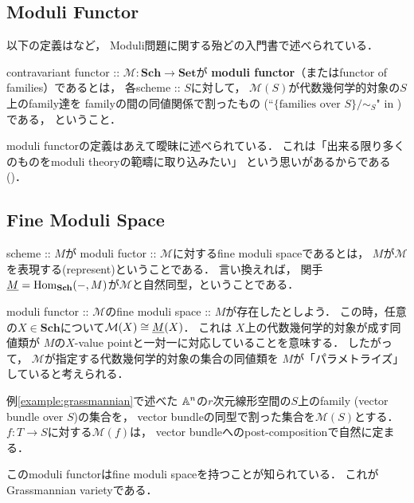 \documentclass[a4paper]{jsarticle}
\newcommand{\Sch}{\mathbf{Sch}}
\newcommand{\Set}{\mathbf{Set}}
\newcommand{\func}[1]{\underline{#1}}
\newcommand{\ftorM}{\mathcal{M}}
\begin{document}
    \subsection{Moduli Functor}
    以下の定義は\cite{HaMo}など，
    Moduli問題に関する殆どの入門書で述べられている．
    \begin{Def}
        contravariant functor :: $\ftorM : \Sch \to \Set$が
        \textbf{moduli functor}（またはfunctor of families）であるとは，
        各scheme :: $S$に対して，
        $\ftorM(S)$が代数幾何学的対象の$S$上のfamily達を
        familyの間の同値関係で割ったもの
        (``$\{ \text{families over }S \}/\sim_S$" in \cite{Hos})である，
        ということ．
    \end{Def}
    moduli functorの定義はあえて曖昧に述べられている．
    これは「出来る限り多くのものをmoduli theoryの範疇に取り込みたい」
    という思いがあるからである(\cite{HaMo})．

    \subsection{Fine Moduli Space}
    \begin{Def}
        scheme :: $M$が
        moduli fuctor :: $\ftorM$に対するfine moduli spaceであるとは，
        $M$が$\ftorM$を表現する(represent)ということである．
        言い換えれば，
        関手$\func{M}=\Hom_{\Sch}(-, M)$が$\ftorM$と自然同型，ということである．
    \end{Def}

    \begin{Remark}
        moduli functor :: $\ftorM$のfine moduli space :: $M$が存在したとしよう．
        この時，任意の$X \in \Sch$について$\ftorM(X) \iso \func{M}(X)$．
        これは
        $X$上の代数幾何学的対象が成す同値類が
        $M$の$X$-value pointと一対一に対応していることを意味する．
        したがって，
        $\ftorM$が指定する代数幾何学的対象の集合の同値類を
        $M$が「パラメトライズ」していると考えられる．
    \end{Remark}

    \begin{Example}
        例\ref{example:grassmannian}で述べた
        $\mathbb{A}^n$の$r$次元線形空間の$S$上のfamily
        (vector bundle over $S$)の集合を，
        vector bundleの同型で割った集合を$\ftorM(S)$とする．
        $f: T \to S$に対する$\ftorM(f)$は，
        vector bundleへのpost-compositionで自然に定まる．

        このmoduli functorはfine moduli spaceを持つことが知られている．
        これがGrassmannian varietyである．
    \end{Example}
\end{document}
